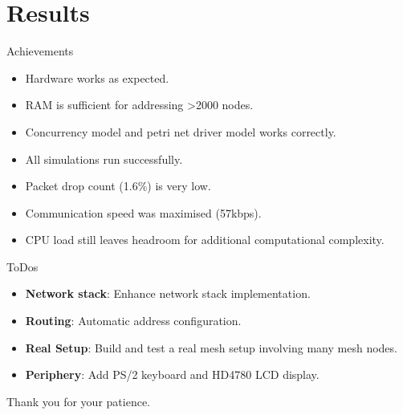\section{Results}
\begin{frame}{Achievements}
\begin{itemize}
    \item Hardware works as expected.
    \item RAM is sufficient for addressing \textgreater2000 nodes.
    \item Concurrency model and petri net driver model works correctly.
    \item All simulations run successfully.
    \item Packet drop count (1.6\%) is very low.
    \item Communication speed was maximised (57kbps).
    \item CPU load still leaves headroom for additional computational complexity.
\end{itemize} 
\end{frame}

\begin{frame}{ToDos}
\begin{itemize}
    \item \textbf{Network stack}: Enhance network stack implementation.
    \item \textbf{Routing}: Automatic address configuration.
    \item \textbf{Real Setup}: Build and test a real mesh setup involving many mesh nodes.
    \item \textbf{Periphery}: Add PS/2 keyboard and HD4780 LCD display.
\end{itemize} 
\end{frame}

\begin{frame}
\begin{center}
   Thank you for your patience.
\end{center} 
\end{frame}
